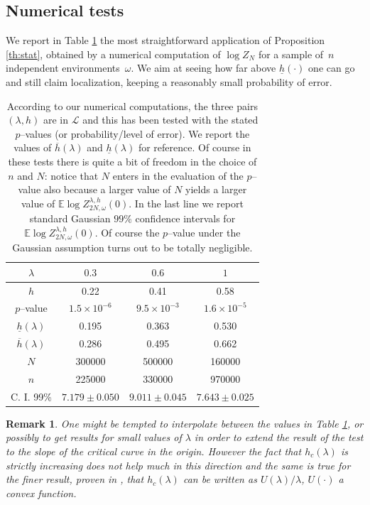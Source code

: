 \documentclass[reqno,11pt]{amsart}
\numberwithin{equation}{section}
\newtheorem{rem}[theorem]{Remark}
\newcommand{\cL}{{\ensuremath{\mathcal L}} }
\newcommand{\bbE}{{\ensuremath{\mathbb E}} }
\newcommand{\go}{\omega}
\newcommand{\gl}{\lambda}
\begin{document}
\subsection{Numerical tests}
We
 report in Table \ref{tbl:1}
 the most  straightforward application
of Proposition \ref{th:stat}, obtained by a numerical computation of $\log Z_N$ for a sample of~$n$ independent environments~$\go$.
We aim
at seeing how far above $\underline{h}(\cdot)$ one can go
and still claim localization,
 keeping a reasonably small probability of error.
\begin{table}[h]
\begin{center}
\begin{tabular}{|c|c|c|c|}
\hline
$\gl $ &$0.3$&$0.6$&$1$\\
\hline
$h$&  0.22 &0.41&0.58\\
\hline
$p$--value& $1.5\times 10^{-6}$&$9.5\times 10^{-3}$&$1.6 \times 10^{-5}$\\
\hline
$\underline{h}(\gl)$& 0.195 &0.363&0.530\\
\hline
$\overline{h}(\gl)$
 & 0.286 &0.495&0.662\\
\hline
$N$& 300000 &500000&160000\\
\hline
$n$& 225000 &330000&970000\\
\hline
C. I.  99\% & $7.179\pm0.050$ &$9.011\pm 0.045$& $7.643 \pm 0.025$\\
\hline
\end{tabular}
\end{center}
\caption{\label{tbl:1}
According to our numerical computations,
the three pairs $(\gl,h)$ are in $\cL$ and this has been tested with the stated
 $p$--values (or probability/level of error).
We report the values of $\overline{h}(\gl)$ and $\underline{h}(\gl)$ for reference.
Of course in these tests there is quite a bit of freedom in the choice of $n$
and $N$: notice that $N$ enters in the evaluation of the $p$--value also
because a larger value of $N$ yields a larger value of $\bbE \log Z_{2N,\go}^{\gl,h}(0)$.
In the last line we report  standard Gaussian $99\%$ confidence intervals for
$\bbE \log Z_{2N,\go}^{\gl,h}(0)$. Of course the $p$--value under the Gaussian assumption
turns out to be totally negligible. }
\end{table}

\begin{rem}
\rm
One might be tempted to interpolate between the values in Table  \ref{tbl:1},
or possibly to get results for small  values of $\gl$ in order to
extend the result of the test to the slope of the critical curve in the origin.
However the fact that $h_c(\gl)$ is strictly increasing does not help much in this direction
and the same is true for
 the finer result, proven in \cite{cf:BG}, that $h_c(\gl)$ can be written as $U(\gl)/\gl$,
$U(\cdot)$ a convex function.
\end{rem}
\end{document}
